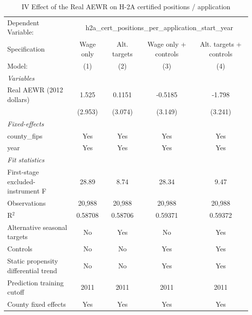 
\begin{table}[htbp]
   \caption{\label{tab:iv_h2a_positions_per_application} IV Effect of the Real AEWR on H-2A certified positions / application}
   \centering
   \begin{tabular}{lcccc}
      \tabularnewline \midrule \midrule
      Dependent Variable: & \multicolumn{4}{c}{h2a\_cert\_positions\_per\_application\_start\_year}\\
      Specification                        & Wage only & Alt. targets & Wage only + controls & Alt. targets + controls \\   
      Model:                               & (1)       & (2)          & (3)                  & (4)\\  
      \midrule
      \emph{Variables}\\
      Real AEWR (2012 dollars)             & 1.525     & 0.1151       & -0.5185              & -1.798\\   
                                           & (2.953)   & (3.074)      & (3.149)              & (3.241)\\   
      \midrule
      \emph{Fixed-effects}\\
      county\_fips                         & Yes       & Yes          & Yes                  & Yes\\  
      year                                 & Yes       & Yes          & Yes                  & Yes\\  
      \midrule
      \emph{Fit statistics}\\
      First-stage excluded-instrument F    & 28.89     & 8.74         & 28.34                & 9.47\\  
      Observations                         & 20,988    & 20,988       & 20,988               & 20,988\\  
      R$^2$                                & 0.58708   & 0.58706      & 0.59371              & 0.59372\\  
      Alternative seasonal targets         & No        & Yes          & No                   & Yes\\  
      Controls                             & No        & No           & Yes                  & Yes\\  
      Static propensity differential trend & No        & No           & Yes                  & Yes\\  
      Prediction training cutoff           & 2011      & 2011         & 2011                 & 2011\\  
      County fixed effects                 & Yes       & Yes          & Yes                  & Yes\\  

\end{tabular}
\end{table}
